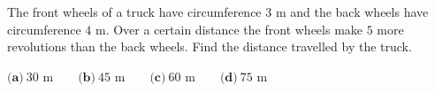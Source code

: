 The front wheels of a truck have circumference $3$ m and the back wheels have circumference $4$ m. Over a certain distance the front wheels make $5$ more revolutions than the back wheels. Find the distance travelled by the truck.

$\textbf{(a)}\ 30\text{ m}\qquad\textbf{(b)}\ 45\text{ m}\qquad\textbf{(c)}\ 60\text{ m}\qquad\textbf{(d)}\ 75\text{ m}$
